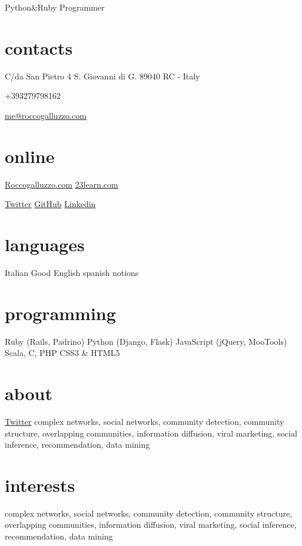 \documentclass[print]{cv}
\begin{document}
       {Python\&Ruby Programmer}

\begin{aside}%
\section{contacts}
    C/da San Pietro 4
    S. Giovanni di G. 
89040 RC - Italy\par\smallskip%
+393279798162\par\smallskip%
	\href{mailto:me@roccogalluzzo.com}{me@roccogalluzzo.com}
	\section{online}
	\href{http://roccogalluzzo.com}{Roccogalluzzo.com}
           \href{http://23learn.com}{23learn.com}\par\smallskip%
	\href{http://twitter.com/byterussian}{Twitter}
           \href{https://github.com/byterussian}{GitHub}
           \href{http://www.linkedin.com/in/roccogalluzzo}{Linkedin}
  \section{languages}
    Italian
    Good English 
    spanish notions
  \section{programming}
    Ruby
    (Rails, Padrino)
    Python
    (Django, Flask)
    JavaScript
    (jQuery, MooTools)
    Scala, C, PHP
    CSS3 \& HTML5
\end{aside}

\section{about}
\href{http://twitter.com/byterussian}{Twitter}
complex networks, social networks, community detection, community structure,
overlapping communities, information diffusion, viral marketing, social
inference, recommendation, data mining

\section{interests}

complex networks, social networks, community detection, community structure,
overlapping communities, information diffusion, viral marketing, social
inference, recommendation, data mining
\end{document}
